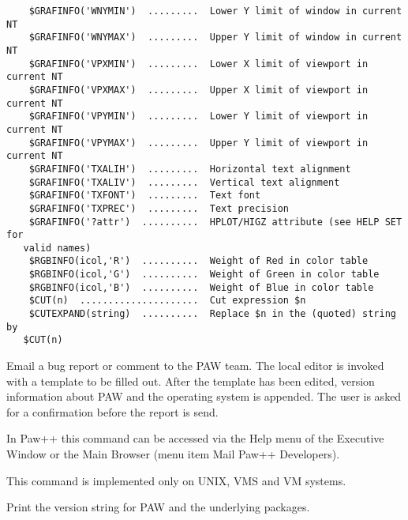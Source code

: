 \begin{verbatim}
    $GRAFINFO('WNYMIN')  .........  Lower Y limit of window in current NT
    $GRAFINFO('WNYMAX')  .........  Upper Y limit of window in current NT
    $GRAFINFO('VPXMIN')  .........  Lower X limit of viewport in current NT
    $GRAFINFO('VPXMAX')  .........  Upper X limit of viewport in current NT
    $GRAFINFO('VPYMIN')  .........  Lower Y limit of viewport in current NT
    $GRAFINFO('VPYMAX')  .........  Upper Y limit of viewport in current NT
    $GRAFINFO('TXALIH')  .........  Horizontal text alignment
    $GRAFINFO('TXALIV')  .........  Vertical text alignment
    $GRAFINFO('TXFONT')  .........  Text font
    $GRAFINFO('TXPREC')  .........  Text precision
    $GRAFINFO('?attr')  ..........  HPLOT/HIGZ attribute (see HELP SET for 
   valid names)
    $RGBINFO(icol,'R')  ..........  Weight of Red in color table
    $RGBINFO(icol,'G')  ..........  Weight of Green in color table
    $RGBINFO(icol,'B')  ..........  Weight of Blue in color table
    $CUT(n)  .....................  Cut expression $n
    $CUTEXPAND(string)  ..........  Replace $n in the (quoted) string by 
   $CUT(n)
\end{verbatim}

\ENDCBIG


\BEGARG
{}
\ENDARG
{}
\ENDOPT

   \par
Email a bug report or comment to the PAW team.  The local editor is invoked 
   with a template to be filled out.  After the template has been edited, 
   version information about PAW and the operating system is appended.  The 
   user is asked for a confirmation before the report is send.  

   \par
In Paw++ this command can be accessed via the \DQUOTE{}Help\DQUOTE{} menu 
   of the \DQUOTE{}Executive Window\DQUOTE{} or the \DQUOTE{}Main 
   Browser\DQUOTE{} (menu item \DQUOTE{}Mail Paw++ Developers\DQUOTE{}).  

   \par
This command is implemented only on UNIX, VMS and VM systems.  

\ENDCMD


   \par
Print the version string for PAW and the underlying packages.  

